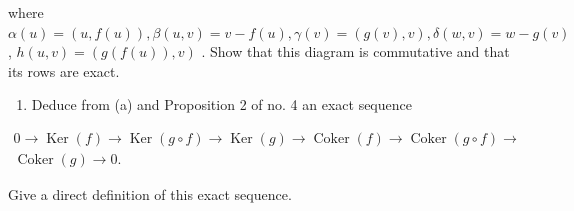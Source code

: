 where \(\alpha(u) = (u, f(u)), \beta(u, v) = v - f(u), \gamma(v) = (g(v), v), \delta(w, v) = w - g(v)\) , \(h(u, v) = (g(f(u)), v)\) . Show that this diagram is commutative and that its rows are exact.

\begin{enumerate}
\def\labelenumi{(\alph{enumi})}
\setcounter{enumi}{1}
\tightlist
\item
  Deduce from (a) and Proposition 2 of no. 4 an exact sequence
\end{enumerate}

\[
\begin{array}{c} 0 \to \operatorname{Ker} (f) \to \operatorname{Ker} (g \circ f) \to \operatorname{Ker} (g) \to \operatorname{Coker} (f) \to \operatorname{Coker} (g \circ f) \to \\ \operatorname{Coker} (g) \to 0. \end{array}
\]

Give a direct definition of this exact sequence.

